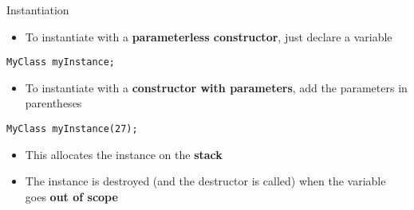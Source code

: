 \begin{frame}[fragile]{Instantiation}
    \begin{itemize}
        \item To instantiate with a \textbf{parameterless constructor}, just declare a variable
    \end{itemize}
    \begin{lstlisting}
MyClass myInstance;
    \end{lstlisting}
    \begin{itemize}
        \item To instantiate with a \textbf{constructor with parameters}, add the parameters in parentheses
    \end{itemize}
    \begin{lstlisting}
MyClass myInstance(27);
    \end{lstlisting}
    \begin{itemize}
        \item This allocates the instance on the \textbf{stack}
        \item The instance is destroyed (and the destructor is called) when the variable goes \textbf{out of scope}
    \end{itemize}
\end{frame}

